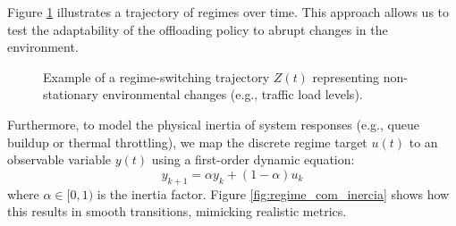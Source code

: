 \documentclass[iicol]{sn-jnl}
\begin{document}
Figure \ref{fig:regime_step_sem_inercia} illustrates a trajectory of regimes over time. This approach allows us to test the adaptability of the offloading policy to abrupt changes in the environment.

\begin{figure}[ht!]
    \centering
    \caption{Example of a regime-switching trajectory $Z(t)$ representing non-stationary environmental changes (e.g., traffic load levels).}
    \label{fig:regime_step_sem_inercia}
\end{figure}

Furthermore, to model the physical inertia of system responses (e.g., queue buildup or thermal throttling), we map the discrete regime target $u(t)$ to an observable variable $y(t)$ using a first-order dynamic equation:
\begin{equation}
    y_{k+1} = \alpha y_k + (1-\alpha)u_k
\end{equation}
where $\alpha \in [0,1)$ is the inertia factor. Figure \ref{fig:regime_com_inercia} shows how this results in smooth transitions, mimicking realistic metrics.
\end{document}
